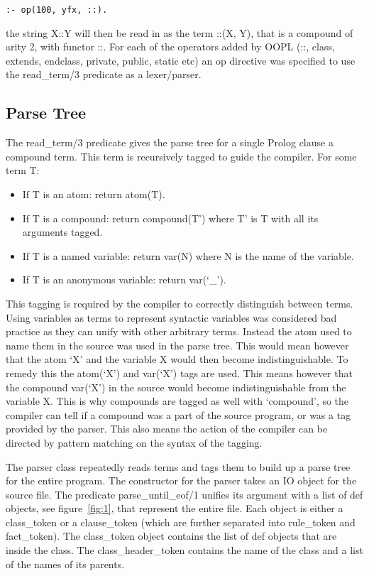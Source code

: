 \documentclass[12pt,a4paper,twoside,openright]{report}
\begin{document}
\begin{verbatim}
:- op(100, yfx, ::).
\end{verbatim}

the string X::Y will then be read in as the term ::(X, Y), that is a compound of arity 2, with functor ::. For each of the operators added by OOPL (::, class, extends, endclass, private, public, static etc) an op directive was specified to use the read_term/3 predicate as a lexer/parser.

\subsection{Parse Tree}

The read_term/3 predicate gives the parse tree for a single Prolog clause a compound term. This term is recursively tagged to guide the compiler. For some term T:

\begin{itemize}
	\item{If T is an atom: return atom(T).}
	\item{If T is a compound: return compound(T') where T' is T with all its arguments tagged.}
	\item{If T is a named variable: return var(N) where N is the name of the variable.}
	\item{If T is an anonymous variable: return var(`_').}
\end{itemize}

This tagging is required  by the compiler to correctly distinguish between terms. Using variables as terms to represent syntactic variables was considered bad practice as they can unify with other arbitrary terms. Instead the atom used to name them in the source was used in the parse tree. This would mean however that the atom `X' and the variable X would then become indistinguishable. To remedy this the atom(`X') and var(`X') tags are used. This means however that the compound var(`X') in the source would become indistinguishable from the variable X. This is why compounds are tagged as well with `compound', so the compiler can tell if a compound was a part of the source program, or was a tag provided by the parser. This also means the action of the compiler can be directed by pattern matching on the syntax of the tagging.

\bigskip

The parser class repeatedly reads terms and tags them to build up a parse tree for the entire program. The constructor for the parser takes an IO object for the source file. The predicate parse_until_eof/1 unifies its argument with a list of def objects, see figure~\ref{fig:1}, that represent the entire file. Each object is either a class_token or a clause_token (which are further separated into rule_token  and fact_token). The class_token object contains the list of def objects that are inside the class. The class_header_token contains the name of the class and a list of the names of its parents.
\end{document}
